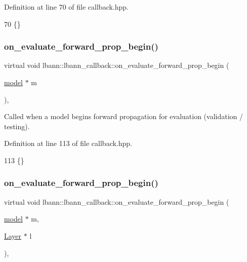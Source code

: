 Definition at line 70 of file callback.\+hpp.


\begin{DoxyCode}
70 \{\}
\end{DoxyCode}
\mbox{\label{classlbann_1_1lbann__callback_a4a2cff48a688bb56ed14b8b53344f945}} 
\subsubsection{\texorpdfstring{on\+\_\+evaluate\+\_\+forward\+\_\+prop\+\_\+begin()}{on\_evaluate\_forward\_prop\_begin()}\hspace{0.1cm}{\footnotesize\ttfamily [1/2]}}
{\footnotesize\ttfamily virtual void lbann\+::lbann\+\_\+callback\+::on\+\_\+evaluate\+\_\+forward\+\_\+prop\+\_\+begin (\begin{DoxyParamCaption}\item[{\hyperlink{classlbann_1_1model}{model} $\ast$}]{m }\end{DoxyParamCaption})\hspace{0.3cm}{\ttfamily [inline]}, {\ttfamily [virtual]}}

Called when a model begins forward propagation for evaluation (validation / testing). 

Definition at line 113 of file callback.\+hpp.


\begin{DoxyCode}
113 \{\}
\end{DoxyCode}
\mbox{\label{classlbann_1_1lbann__callback_a044174864e4981a1dac093d58e8c4d6c}} 
\subsubsection{\texorpdfstring{on\+\_\+evaluate\+\_\+forward\+\_\+prop\+\_\+begin()}{on\_evaluate\_forward\_prop\_begin()}\hspace{0.1cm}{\footnotesize\ttfamily [2/2]}}
{\footnotesize\ttfamily virtual void lbann\+::lbann\+\_\+callback\+::on\+\_\+evaluate\+\_\+forward\+\_\+prop\+\_\+begin (\begin{DoxyParamCaption}\item[{\hyperlink{classlbann_1_1model}{model} $\ast$}]{m,  }\item[{\hyperlink{classlbann_1_1Layer}{Layer} $\ast$}]{l }\end{DoxyParamCaption})\hspace{0.3cm}{\ttfamily [inline]}, {\ttfamily [virtual]}}

